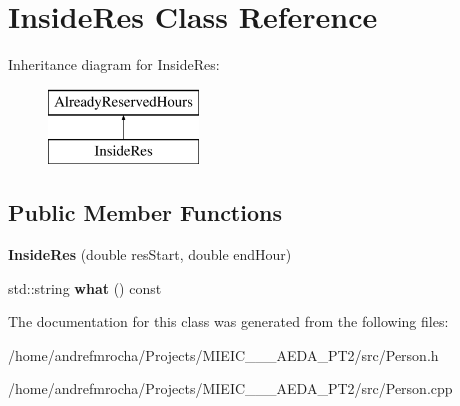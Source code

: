 \hypertarget{class_inside_res}{}\section{Inside\+Res Class Reference}
\label{class_inside_res}
Inheritance diagram for Inside\+Res\+:\begin{figure}[H]
\begin{center}
\leavevmode
\includegraphics[height=2.000000cm]{class_inside_res}
\end{center}
\end{figure}
\subsection*{Public Member Functions}
\begin{DoxyCompactItemize}
\item 
\mbox{\label{class_inside_res_ad447dd2fb8257c0e07ff171b6b8403d9}} 
{\bfseries Inside\+Res} (double res\+Start, double end\+Hour)
\item 
\mbox{\label{class_inside_res_af8e96688976739ec91630a369d4b94e7}} 
std\+::string {\bfseries what} () const
\end{DoxyCompactItemize}


The documentation for this class was generated from the following files\+:\begin{DoxyCompactItemize}
\item 
/home/andrefmrocha/\+Projects/\+M\+I\+E\+I\+C\+\_\+\_\+\_\+\+A\+E\+D\+A\+\_\+\+P\+T2/src/Person.\+h\item 
/home/andrefmrocha/\+Projects/\+M\+I\+E\+I\+C\+\_\+\_\+\_\+\+A\+E\+D\+A\+\_\+\+P\+T2/src/Person.\+cpp\end{DoxyCompactItemize}
